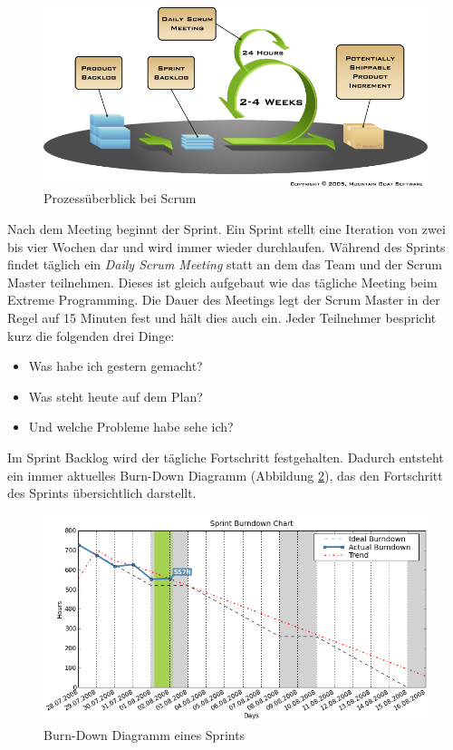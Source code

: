 \begin{figure}[h]
  \centering
  \includegraphics[width=1\textwidth]{images/scrum}
  \caption{Prozessüberblick bei Scrum \cite{bib:mountaingoat}}
  \label{fig:scrum}
\end{figure}

Nach dem Meeting beginnt der Sprint. Ein Sprint stellt eine Iteration von zwei bis vier Wochen dar und wird immer wieder durchlaufen. Während des Sprints findet täglich ein \emph{Daily Scrum Meeting} statt an dem das Team und der Scrum Master teilnehmen. Dieses ist gleich aufgebaut wie das tägliche Meeting beim Extreme Programming. Die Dauer des Meetings legt der Scrum Master in der Regel auf 15 Minuten fest und hält dies auch ein. Jeder Teilnehmer bespricht kurz die folgenden drei Dinge:
\begin{itemize}
  \item Was habe ich gestern gemacht? 
  \item Was steht heute auf dem Plan? 
  \item Und welche Probleme habe sehe ich?
\end{itemize}
Im Sprint Backlog wird der tägliche Fortschritt festgehalten. Dadurch entsteht ein immer aktuelles Burn-Down Diagramm (Abbildung \ref{fig:burndown}), das den Fortschritt des Sprints übersichtlich darstellt. 

\begin{figure}[h]
  \centering
  \includegraphics[width=1\textwidth]{images/burndown}
  \caption{Burn-Down Diagramm eines Sprints \cite{bib:agilo}}
  \label{fig:burndown}
\end{figure}


